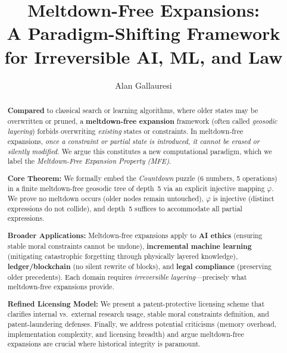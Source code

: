 \documentclass[acmsmall]{acmart}
\theoremstyle{definition}
\theoremstyle{remark}
\begin{document}
\title{Meltdown-Free Expansions: \\
A Paradigm-Shifting Framework for Irreversible AI, ML, and Law}

\author{Alan Gallauresi}

\begin{abstract}
\textbf{Compared} to classical search or learning algorithms, where older states
may be overwritten or pruned, a \textbf{meltdown-free expansion} framework
(often called \emph{geosodic layering}) forbids overwriting \emph{existing}
states or constraints. In meltdown-free expansions, \emph{once a constraint or
partial state is introduced, it cannot be erased or silently modified.} We
argue this constitutes a new computational paradigm, which we label the
\emph{Meltdown-Free Expansion Property (MFE)}.

\textbf{Core Theorem:} We formally embed the \emph{Countdown} puzzle (6 numbers,
5 operations) in a finite meltdown-free geosodic tree of depth~5 via an explicit
injective mapping \(\varphi\). We prove no meltdown occurs (older nodes remain
untouched), \(\varphi\) is injective (distinct expressions do not collide), and
depth~5 suffices to accommodate all partial expressions.

\textbf{Broader Applications:} Meltdown-free expansions apply to \textbf{AI ethics}
(ensuring stable moral constraints cannot be undone), \textbf{incremental machine learning}
(mitigating catastrophic forgetting through physically layered knowledge),
\textbf{ledger/blockchain} (no silent rewrite of blocks), and \textbf{legal compliance}
(preserving older precedents). Each domain requires \emph{irreversible layering}—precisely
what meltdown-free expansions provide.

\textbf{Refined Licensing Model:} We present a patent-protective licensing scheme
that clarifies internal vs.\ external research usage, stable moral constraints definition,
and patent-laundering defenses. Finally, we address potential criticisms (memory overhead,
implementation complexity, and licensing breadth) and argue meltdown-free expansions
are crucial where historical integrity is paramount.
\end{abstract}

\maketitle
\end{document}

